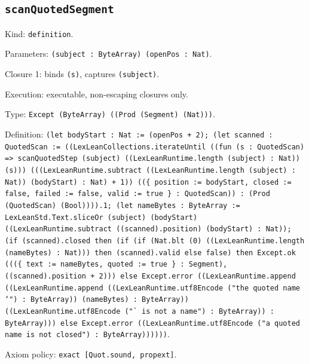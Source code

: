 \documentclass[11pt]{article}
\begin{document}
\subsection*{\texttt{scanQuotedSegment}}
\noindent Kind: \texttt{definition}.\par
\noindent Parameters: \texttt{(subject : ByteArray) (openPos : Nat)}.\par
\noindent Closure 1: binds \texttt{(s)}, captures \texttt{(subject)}.\par
\noindent Execution: executable, non-escaping closures only.\par
\noindent Type: \texttt{Except (ByteArray) ((Prod (Segment) (Nat)))}.\par
\noindent Definition: \texttt{(let bodyStart : Nat := (openPos + 2); (let scanned : QuotedScan := ((LexLeanCollections.iterateUntil ((fun (s : QuotedScan) => scanQuotedStep (subject) ((LexLeanRuntime.length (subject) : Nat)) (s))) (((LexLeanRuntime.subtract ((LexLeanRuntime.length (subject) : Nat)) (bodyStart) : Nat) + 1)) ((\{ position := bodyStart, closed := false, failed := false, valid := true \} : QuotedScan)) : (Prod (QuotedScan) (Bool)))).1; (let nameBytes : ByteArray := LexLeanStd.Text.sliceOr (subject) (bodyStart) ((LexLeanRuntime.subtract ((scanned).position) (bodyStart) : Nat)); (if (scanned).closed then (if (if (Nat.blt (0) ((LexLeanRuntime.length (nameBytes) : Nat))) then (scanned).valid else false) then Except.ok (((\{ text := nameBytes, quoted := true \} : Segment), ((scanned).position + 2))) else Except.error ((LexLeanRuntime.append ((LexLeanRuntime.append ((LexLeanRuntime.utf8Encode ("the quoted name `") : ByteArray)) (nameBytes) : ByteArray)) ((LexLeanRuntime.utf8Encode ("` is not a name") : ByteArray)) : ByteArray))) else Except.error ((LexLeanRuntime.utf8Encode ("a quoted name is not closed") : ByteArray))))))}.\par
\noindent Axiom policy: \texttt{exact [Quot.sound, propext]}.\par
\end{document}
